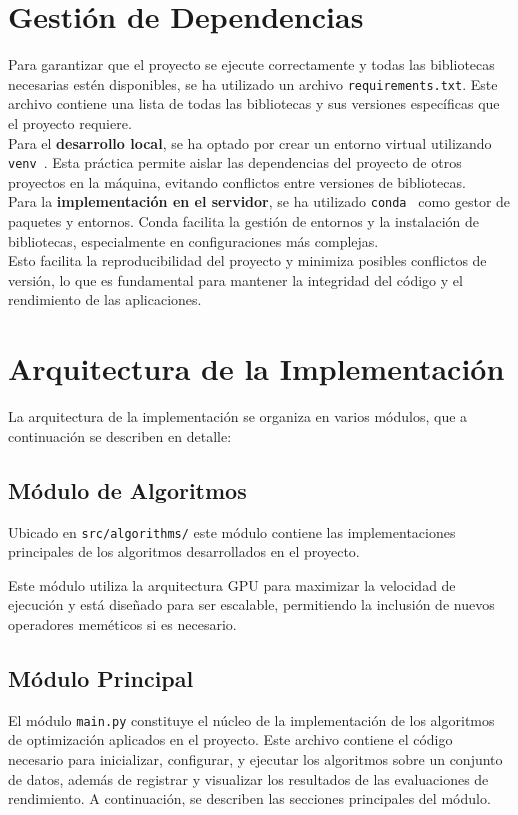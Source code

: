 \section{Gestión de Dependencias}\label{sec:gestion-de-dependencias}
Para garantizar que el proyecto se ejecute correctamente y todas las bibliotecas necesarias estén disponibles, se ha
utilizado un archivo \texttt{requirements.txt}.
Este archivo contiene una lista de todas las bibliotecas y sus versiones específicas que el proyecto requiere. \\[6pt]

Para el \textbf{desarrollo local}, se ha optado por crear un entorno virtual utilizando
\texttt{venv}~\cite{noauthor_creation_nodate}.
Esta práctica permite aislar las dependencias del proyecto de otros proyectos en la máquina, evitando conflictos entre
versiones de bibliotecas. \\[6pt]

Para la \textbf{implementación en el servidor}, se ha utilizado \texttt{conda}~\cite{noauthor_conda_nodate} como gestor
de paquetes y entornos.
Conda facilita la gestión de entornos y la instalación de bibliotecas, especialmente en configuraciones más complejas.
\\[6pt]

Esto facilita la reproducibilidad del proyecto y minimiza posibles conflictos de versión, lo que es fundamental para
mantener la integridad del código y el rendimiento de las aplicaciones.

\section{Arquitectura de la Implementación}\label{sec:arquitectura-de-la-implementacion}
La arquitectura de la implementación se organiza en varios módulos, que a continuación se describen en detalle:

\subsection{Módulo de Algoritmos}\label{subsec:modulo-de-algoritmos}
Ubicado en \texttt{src/algorithms/} este módulo contiene las implementaciones principales de los
algoritmos desarrollados en el proyecto.

Este módulo utiliza la arquitectura GPU para maximizar la velocidad de ejecución y está diseñado para ser escalable,
permitiendo la inclusión de nuevos operadores meméticos si es necesario.

\subsection{Módulo Principal}\label{subsec:modulo-principal}
El módulo \texttt{main.py} constituye el núcleo de la implementación de los algoritmos de optimización aplicados en el
proyecto.
Este archivo contiene el código necesario para inicializar, configurar, y ejecutar los algoritmos sobre un conjunto de
datos, además de registrar y visualizar los resultados de las evaluaciones de rendimiento.
A continuación, se describen las secciones principales del módulo. \\[6pt]

